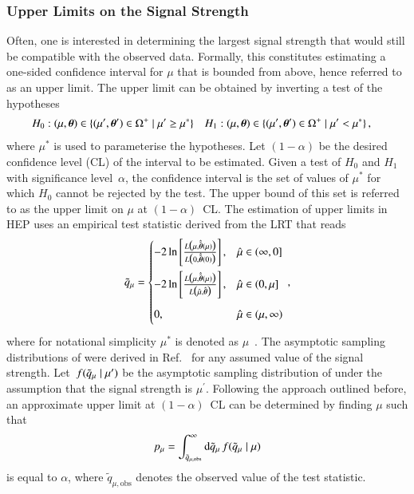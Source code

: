 \subsubsection{Upper Limits on the Signal Strength}

Often, one is interested in determining the largest signal strength that would
still be compatible with the observed data. Formally, this constitutes
estimating a one-sided confidence interval for $\mu$ that is bounded from above,
hence referred to as an upper limit. The upper limit can be obtained by
inverting a test of the hypotheses
\begin{align*}
  &H_0: (\mu, \myvec{\theta}) \in \{ (\mu^\prime, \myvec{\theta}^\prime) \in \Omega^+ \mid \mu^\prime \geq \mu^* \}
  &&H_1: (\mu, \myvec{\theta}) \in \{ (\mu^\prime, \myvec{\theta}^\prime) \in \Omega^+ \mid \mu^\prime < \mu^* \} \,\text{,}
\end{align*}
where $\mu^*$ is used to parameterise the hypotheses. Let $(1 - \alpha)$ be the
desired confidence level (CL) of the interval to be estimated. Given a test of
$H_0$ and $H_1$ with significance level~$\alpha$, the confidence interval is the
set of values of $\mu^*$ for which $H_0$ cannot be rejected by the test. The
upper bound of this set is referred to as the upper limit on $\mu$ at
$(1 - \alpha)$~CL. The estimation of upper limits in HEP uses an empirical test
statistic derived from the LRT that reads
\begin{align*}
  \qmutilde =
  \begin{cases}
    -2\ln\left[ \frac{ L\bigl( \mu, \hat{\hat{\myvec{\theta}}}(\mu) \bigr)}{L\bigl( 0, \hat{\hat{\myvec{\theta}}}(0) \bigr)} \right], & \muhat \in (\infty, 0] \\[1em]
    -2\ln\left[ \frac{ L\bigl( \mu, \hat{\hat{\myvec{\theta}}}(\mu) \bigr)}{L\bigl( \muhat, \hat{\myvec{\theta}} \bigr)} \right], & \muhat \in (0, \mu] \\[1em]
    0,\phantom{ \biggl[  \biggr]} & \muhat \in (\mu, \infty) \\
  \end{cases} \,\text{,}
\end{align*}
where for notational simplicity $\mu^*$ is denoted as
$\mu$~\cite{Cowan:2010js}. The asymptotic sampling distributions of \qmutilde
were derived in Ref.~\cite{Cowan:2010js} for any assumed value of the signal
strength. Let~$f(\tilde{q}_{\mu} \mid \mu^\prime)$ be the asymptotic sampling
distribution of \qmutilde under the assumption that the signal strength is
$\mu^\prime$. Following the approach outlined before, an approximate upper limit
at $(1 - \alpha)$~CL can be determined by finding $\mu$ such that
\begin{align*}
  p_\mu = \int_{\tilde{q}_{\mu, \text{obs}}}^{\infty} \mathrm{d}\tilde{q}_{\mu} \, f(\tilde{q}_{\mu} \mid \mu)
\end{align*}
is equal to $\alpha$, where $\tilde{q}_{\mu, \text{obs}}$ denotes the observed
value of the test statistic.

